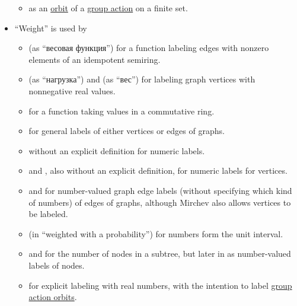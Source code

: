 \begin{remark}
\begin{itemize}
\begin{itemize}
      \item {} as an \hyperref[def:group_action_orbit]{orbit} of a \hyperref[def:group_action]{group action} on a finite set.
    \end{itemize}

    \item \enquote{Weight} is used by
    \begin{itemize}
      \item {} (as \enquote{весовая функция}) for a function labeling edges with nonzero elements of an idempotent semiring.

      \item {} (as \enquote{нагрузка}) and  (as \enquote{вес}) for labeling graph vertices with nonnegative real values.

      \item {} for a function taking values in a commutative ring.


      \item {} for general labels of either vertices or edges of graphs.

      \item {} without an explicit definition for numeric labels.

      \item {} and , also without an explicit definition, for numeric labels for vertices.

      \item {} and  for number-valued graph edge labels (without specifying which kind of numbers) of edges of graphs, although Mirchev also allows vertices to be labeled.

      \item {} (in \enquote{weighted with a probability}) for numbers form the unit interval.

      \item {} and  for the number of nodes in a subtree, but later in  as number-valued labels of nodes.

      \item {} for explicit labeling with real numbers, with the intention to label \hyperref[def:group_action_orbit]{group action orbits}.


\end{itemize}
\end{itemize}
\end{remark}
